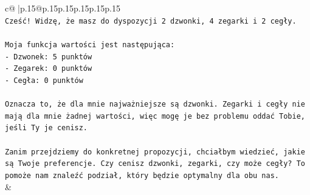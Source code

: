 \documentclass{article}
\begin{document}
{\begin{supertabular}{c@{$\;$}|p{.15\linewidth}@{}p{.15\linewidth}p{.15\linewidth}p{.15\linewidth}p{.15\linewidth}p{.15\linewidth}}
{{{\\ 
\texttt{Cześć! Widzę, że masz do dyspozycji 2 dzwonki, 4 zegarki i 2 cegły.} \\
\\ 
\texttt{Moja funkcja wartości jest następująca:} \\
\texttt{{-} Dzwonek: 5 punktów} \\
\texttt{{-} Zegarek: 0 punktów} \\
\texttt{{-} Cegła: 0 punktów} \\
\\ 
\texttt{Oznacza to, że dla mnie najważniejsze są dzwonki. Zegarki i cegły nie mają dla mnie żadnej wartości, więc mogę je bez problemu oddać Tobie, jeśli Ty je cenisz.} \\
\\ 
\texttt{Zanim przejdziemy do konkretnej propozycji, chciałbym wiedzieć, jakie są Twoje preferencje. Czy cenisz dzwonki, zegarki, czy może cegły? To pomoże nam znaleźć podział, który będzie optymalny dla obu nas.} \\
            }
        }
    }
    & \\ \\


\end{supertabular}}
\end{document}
